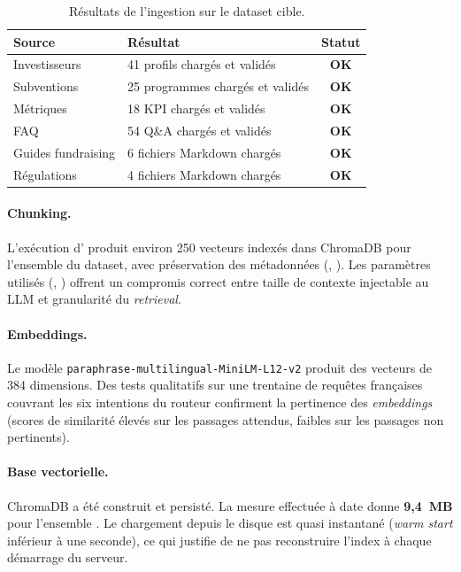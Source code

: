\begin{table}[H]
\centering
\caption{Résultats de l'ingestion sur le dataset cible.}
\label{tab:ingestion}
\begin{tabularx}{\textwidth}{@{}l X c@{}}
\toprule
\textbf{Source} & \textbf{Résultat} & \textbf{Statut} \\
\midrule
Investisseurs        & 41 profils chargés et validés & \textbf{OK} \\
Subventions          & 25 programmes chargés et validés & \textbf{OK} \\
Métriques            & 18 \ac{KPI} chargés et validés & \textbf{OK} \\
\ac{FAQ}             & 54 Q\&A chargés et validés & \textbf{OK} \\
Guides fundraising   & 6 fichiers Markdown chargés & \textbf{OK} \\
Régulations          & 4 fichiers Markdown chargés & \textbf{OK} \\
\bottomrule
\end{tabularx}
\end{table}

\paragraph{Chunking.} L'exécution d' produit environ 250 vecteurs indexés dans ChromaDB pour l'ensemble du dataset, avec préservation des métadonnées (, ). Les paramètres utilisés (, ) offrent un compromis correct entre taille de contexte injectable au \ac{LLM} et granularité du \textit{retrieval}.

\paragraph{Embeddings.} Le modèle \texttt{paraphrase-multilingual-MiniLM-L12-v2} produit des vecteurs de 384 dimensions. Des tests qualitatifs sur une trentaine de requêtes françaises couvrant les six intentions du routeur confirment la pertinence des \textit{embeddings} (scores de similarité élevés sur les passages attendus, faibles sur les passages non pertinents).

\paragraph{Base vectorielle.} ChromaDB a été construit et persisté. La mesure effectuée à date donne \textbf{9,4~MB} pour l'ensemble . Le chargement depuis le disque est quasi instantané (\textit{warm start} inférieur à une seconde), ce qui justifie de ne pas reconstruire l'index à chaque démarrage du serveur.

